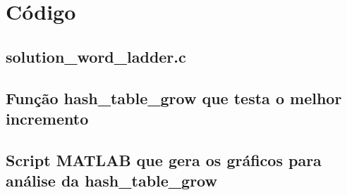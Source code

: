 \documentclass[portuguese,11pt,a4paper,titlepage]{article}
\newcommand{\srcdir}{..}
\newcommand{\hashtablegrowdir}{\srcdir/hash\_table\_grow-test}
\begin{document}
\pagebreak
\section{Código}
\subsection{solution\_word\_ladder.c}

\pagebreak
\subsection{Função hash\_table\_grow que testa o melhor incremento}

\pagebreak
\subsection{Script MATLAB que gera os gráficos para análise da hash\_table\_grow} \label{MATLABcode}

\end{document}
